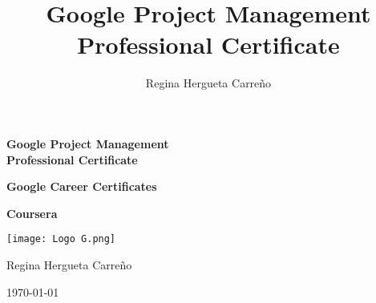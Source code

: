 \documentclass[10pt,a4paper,twoside,openright,titlepage,openbib]{book}
\author{Regina Hergueta Carreño}
\title{Google Project Management Professional Certificate}
\begin{document}

\begin{titlepage}

    \frontmatter %

    \begin{titlepage}
    \begin{center}
    
    \vspace{4cm}
    {\Huge \textbf{Google Project Management\\Professional Certificate}}
    
    \vspace{1cm}
    {\LARGE \textbf{Google Career Certificates}}
    
    \vspace{1cm}
    {\Large \textbf{Coursera}}

    \vfill
    \texttt{[image: Logo G.png]}
    \vfill

    {\Large Regina Hergueta Carreño}
    
    \vspace{0.5cm}
    {\large \today}
    
    \end{center}
    \end{titlepage}

\end{titlepage}


\tableofcontents %


\mainmatter%


 







\printindex %
\end{document}
